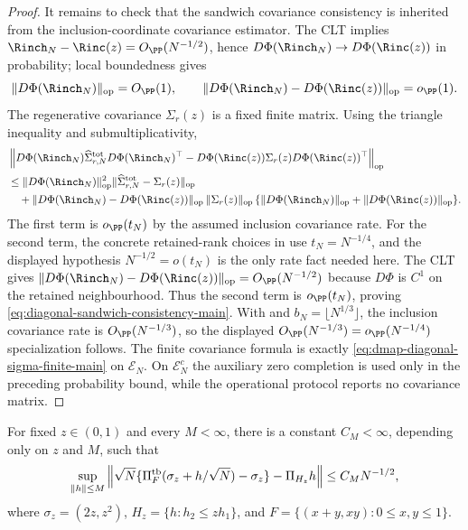 \begin{proof}
It remains to check that the sandwich covariance consistency is inherited from
the inclusion-coordinate covariance estimator.  The CLT implies
\(\Rinch_N-\Rinc(z)=O_{\PP}(N^{-1/2})\), hence
\(D\Phi(\Rinch_N)\to D\Phi(\Rinc(z))\) in probability; local boundedness gives
\[
\|D\Phi(\Rinch_N)\|_{\operatorname{op}}=O_{\PP}(1),\qquad
\|D\Phi(\Rinch_N)-D\Phi(\Rinc(z))\|_{\operatorname{op}}=o_{\PP}(1).
\]
The regenerative covariance \(\Sigma_r(z)\) is a fixed finite matrix.  Using
the triangle inequality and submultiplicativity,
\[
\begin{aligned}
&\left\|
D\Phi(\Rinch_N)\widehat\Sigma_{r,N}^{\rm tot}D\Phi(\Rinch_N)^\top
-D\Phi(\Rinc(z))\Sigma_r(z)D\Phi(\Rinc(z))^\top
\right\|_{\operatorname{op}}\\
&\le
\|D\Phi(\Rinch_N)\|_{\operatorname{op}}^2
\|\widehat\Sigma_{r,N}^{\rm tot}-\Sigma_r(z)\|_{\operatorname{op}}\\
&\quad+
\|D\Phi(\Rinch_N)-D\Phi(\Rinc(z))\|_{\operatorname{op}}\,
\|\Sigma_r(z)\|_{\operatorname{op}}\,
\{\|D\Phi(\Rinch_N)\|_{\operatorname{op}}
+\|D\Phi(\Rinc(z))\|_{\operatorname{op}}\}.
\end{aligned}
\]
The first term is \(o_{\PP}(t_N)\) by the assumed inclusion covariance rate.
For the second term, the concrete retained-rank choices in
 use \(t_N=N^{-1/4}\), and the displayed
hypothesis \(N^{-1/2}=o(t_N)\) is the only rate fact needed here.  The CLT gives
\(\|D\Phi(\Rinch_N)-D\Phi(\Rinc(z))\|_{\operatorname{op}}=O_{\PP}(N^{-1/2})\)
because \(D\Phi\) is \(C^1\) on the retained neighbourhood.  Thus the second
term is \(o_{\PP}(t_N)\), proving
\eqref{eq:diagonal-sandwich-consistency-main}.  With
 and
\(b_N=\lfloor N^{1/3}\rfloor\), the inclusion covariance rate is
\(O_{\PP}(N^{-1/3})\), so the displayed \(O_{\PP}(N^{-1/3})=o_{\PP}(N^{-1/4})\)
specialization follows.  The finite covariance formula is exactly
\eqref{eq:dmap-diagonal-sigma-finite-main} on \(\mathcal E_N\).  On
\(\mathcal E_N^c\) the auxiliary zero completion is used only in the preceding
probability bound, while the operational protocol reports no covariance matrix.
\end{proof}

\begin{lemma}\label{lem:local-projection-expansion-before-theorem-e-main}
For fixed \(z\in(0,1)\) and every \(M<\infty\), there is a constant
\(C_M<\infty\), depending only on \(z\) and \(M\), such that
\[
\sup_{\|h\|\le M}
\left\|
\sqrt N\{\Pi_F^{\rm tb}(\sigma_z+h/\sqrt N)-\sigma_z\}
-\Pi_{H_z}h
\right\|
\le C_MN^{-1/2},
\]
where \(\sigma_z=(2z,z^2)\), \(H_z=\{h:h_2\le zh_1\}\), and
\(F=\{(x+y,xy):0\le x,y\le1\}\).
\end{lemma}

